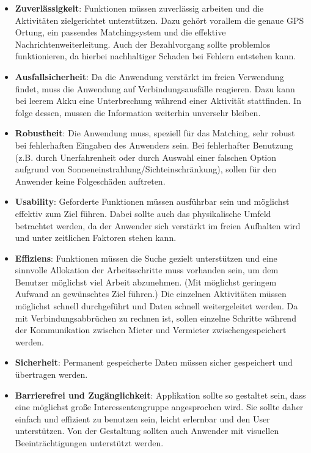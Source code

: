\begin{itemize}
   \item 
   \textbf{Zuverlässigkeit}: Funktionen müssen zuverlässig arbeiten und die Aktivitäten zielgerichtet unterstützen. Dazu gehört vorallem die genaue GPS Ortung, ein passendes Matchingsystem und die effektive Nachrichtenweiterleitung. Auch der Bezahlvorgang sollte problemlos funktionieren, da hierbei nachhaltiger Schaden bei Fehlern entstehen kann. 

   \item
   \textbf{Ausfallsicherheit}: Da die Anwendung verstärkt im freien Verwendung findet, muss die Anwendung auf Verbindungsausfälle reagieren. Dazu kann bei leerem Akku eine Unterbrechung während einer Aktivität stattfinden. In folge dessen, mussen die Information weiterhin unversehr bleiben.

   \item
   \textbf{Robustheit}: Die Anwendung muss, speziell für das Matching, sehr robust bei fehlerhaften Eingaben des Anwenders sein. Bei fehlerhafter Benutzung (z.B. durch Unerfahrenheit oder durch Auswahl einer falschen Option aufgrund von Sonneneinstrahlung/Sichteinschränkung), sollen für den Anwender keine Folgeschäden auftreten.

   \item
   \textbf{Usability}: Geforderte Funktionen müssen ausführbar sein und möglichst effektiv zum Ziel führen. Dabei sollte auch das physikalische Umfeld betrachtet werden, da der Anwender sich verstärkt im freien Aufhalten wird und unter zeitlichen Faktoren stehen kann.
   
   \item 
   \textbf{Effiziens}: Funktionen müssen die Suche gezielt unterstützen und eine sinnvolle Allokation der Arbeitsschritte muss vorhanden sein, um dem Benutzer möglichst viel Arbeit abzunehmen. (Mit möglichst geringem Aufwand an gewünschtes Ziel führen.)
   Die einzelnen Aktivitäten müssen möglichst schnell durchgeführt und Daten schnell weitergeleitet werden. Da mit Verbindungsabbrüchen zu rechnen ist, sollen einzelne Schritte während der Kommunikation zwischen Mieter und Vermieter zwischengespeichert werden.
   
   \item
   \textbf{Sicherheit}: Permanent gespeicherte Daten müssen sicher gespeichert und übertragen werden. 

   \item
   \textbf{Barrierefrei und Zugänglichkeit}: Applikation sollte so gestaltet sein, dass eine möglichst große Interessentengruppe angesprochen wird. Sie sollte daher einfach und effizient zu benutzen sein, leicht erlernbar und den User unterstützen. Von der  Gestaltung sollten auch Anwender mit visuellen Beeinträchtigungen unterstützt werden.
\end{itemize}



